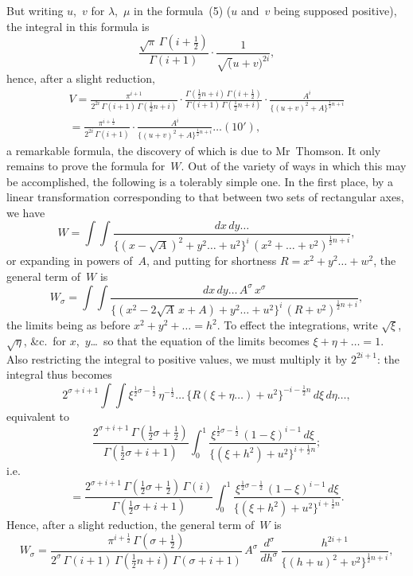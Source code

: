 \documentclass[11pt,a4paper]{article}
\begin{document}
\newpage
But writing $u$,~$v$ for $\lambda$,~$\mu$ in the formula~(5) ($u$ and~$v$ being supposed positive), the integral in this formula is
\[
\frac{\sqrt{\pi}\,\Gamma(i+\frac{1}{2})}{\Gamma(i+1)} \cdot \frac{1}{\surd(u+v)^{2i}},
\]
hence, after a slight reduction,
\begin{multline*}
V = \frac{\pi^{i+1}}{2^{2i}\,\Gamma(i+1)\,\Gamma(\frac{1}{2}n+i)} \cdot \frac{\Gamma(\frac{1}{2}n+i)\,\Gamma(i+\frac{1}{2})}{\Gamma(i+1)\,\Gamma(\frac{1}{2}n+i)} \cdot \frac{A^i}{\{(u+v)^2 + A\}^{\frac{1}{2}n+i}} \\
= \frac{\pi^{i+\frac{1}{2}}}{2^{2i}\,\Gamma(i+1)} \cdot \frac{A^i}{\{(u+v)^2 + A\}^{\frac{1}{2}n+i}} \ldots(10'),
\end{multline*}
a remarkable formula, the discovery of which is due to Mr~Thomson. It only remains to prove the formula for~$W$. Out of the variety of ways in which this may be accomplished, the following is a tolerably simple one. In the first place, by a linear transformation corresponding to that between two sets of rectangular axes, we have
\[
W = \int\!\!\int \frac{dx\,dy\ldots}{\{(x-\surd A)^2 + y^2\ldots + u^2\}^i \, (x^2 + \ldots + v^2)^{\frac{1}{2}n+i}},
\]
or expanding in powers of~$A$, and putting for shortness $R = x^2 + y^2\ldots + w^2$, the general term of~$W$ is
\[
W_\sigma = \int\!\!\int \frac{dx\,dy\ldots\,A^\sigma\,x^\sigma}{\{(x^2 - 2\surd A\,x + A) + y^2\ldots + u^2\}^i \, (R + v^2)^{\frac{1}{2}n+i}},
\]
the limits being as before $x^2 + y^2 + \ldots = h^2$. To effect the integrations, write $\surd\xi$, $\surd\eta$, \&c.\ for $x$,~$y$\ldots\ so that the equation of the limits becomes $\xi + \eta + \ldots = 1$. Also restricting the integral to positive values, we must multiply it by $2^{2i+1}$: the integral thus becomes
\[
2^{\sigma+i+1} \int\!\!\int \xi^{\frac{1}{2}\sigma - \frac{1}{2}} \, \eta^{-\frac{1}{2}} \ldots \, \{R(\xi + \eta\ldots) + u^2\}^{-i-\frac{1}{2}n} \, d\xi\,d\eta\ldots,
\]
equivalent to
\[
\frac{2^{\sigma+i+1}\,\Gamma(\frac{1}{2}\sigma + \frac{1}{2})}{\Gamma(\frac{1}{2}\sigma + i + 1)} \int_0^1 \frac{\xi^{\frac{1}{2}\sigma - \frac{1}{2}} \, (1-\xi)^{i-1}\,d\xi}{\{(\xi + h^2) + u^2\}^{i+\frac{1}{2}n}};
\]
i.e.
\[
= \frac{2^{\sigma+i+1}\,\Gamma(\frac{1}{2}\sigma + \frac{1}{2})\,\Gamma(i)}{\Gamma(\frac{1}{2}\sigma + i + 1)} \int_0^1 \frac{\xi^{\frac{1}{2}\sigma - \frac{1}{2}} \, (1-\xi)^{i-1}\,d\xi}{\{(\xi + h^2) + u^2\}^{i+\frac{1}{2}n}}.
\]
Hence, after a slight reduction, the general term of~$W$ is
\[
W_\sigma = \frac{\pi^{i+\frac{1}{2}}\,\Gamma(\sigma+\frac{1}{2})}{2^{\sigma}\,\Gamma(i+1)\,\Gamma(\frac{1}{2}n+i)\,\Gamma(\sigma+i+1)} \, A^\sigma \, \frac{d^\sigma}{dh^\sigma} \, \frac{h^{2i+1}}{\{(h+u)^2 + v^2\}^{\frac{1}{2}n+i}},
\]
\end{document}
